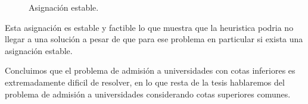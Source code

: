 \begin{eje}
\begin{figure}[H]

\caption{Asignación estable.}
\end{figure}

Esta asignación es estable y factible lo que muestra que la heuristica podria no llegar a una solución a pesar de que para ese problema en particular si exista una asignación estable. \fin

\end{eje}

Concluimos que el problema de admisión a universidades con cotas inferiores es extremadamente dificil de resolver, en lo que resta de la tesis hablaremos del problema de admisión a universidades considerando cotas superiores comunes. 



